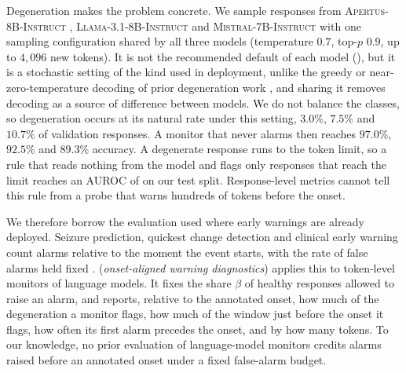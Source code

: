 Degeneration makes the problem concrete. We sample responses from
\textsc{Apertus-8B-Instruct} \citep{apertus2025},
\textsc{Llama-3.1-8B-Instruct} \citep{grattafiori2024llama} and
\textsc{Mistral-7B-Instruct} \citep{jiang2023mistral} with one sampling
configuration shared by all three models (temperature $0.7$, top-$p$ $0.9$, up
to $4{,}096$ new tokens). It is not the recommended default of each model
(), but it is a
stochastic setting of the kind used in deployment, unlike the greedy or
near-zero-temperature decoding of prior degeneration work
\citep{xie2025wordsalad,duan2026circular}, and sharing it removes decoding as a
source of difference between models. We do not balance the classes, so
degeneration occurs at its natural rate under this setting, $3.0\%$, $7.5\%$
and $10.7\%$ of validation responses. A monitor that never alarms then reaches $97.0\%$, $92.5\%$ and
$89.3\%$ accuracy. A degenerate response runs to the token limit, so a rule
that reads nothing from the model and flags only responses that reach the limit
reaches an AUROC of  on our test split. Response-level metrics
cannot tell this rule from a probe that warns hundreds of tokens before the
onset.

We therefore borrow the evaluation used where early warnings are already
deployed. Seizure prediction, quickest change detection and clinical early
warning count alarms relative to the moment the event starts, with the rate of
false alarms held fixed \citep{winterhalder2003seizure,basseville1993detection,hyland2020circulatory}.
\method{} (\emph{onset-aligned warning diagnostics}) applies this to token-level
monitors of language models. It fixes the share $\beta$ of healthy responses
allowed to raise an alarm, and reports, relative to the annotated onset, how much
of the degeneration a monitor flags, how much of the window just before the onset
it flags, how often its first alarm precedes the onset, and by how many tokens.
To our knowledge, no prior evaluation of language-model monitors credits alarms
raised before an annotated onset under a fixed false-alarm budget.

